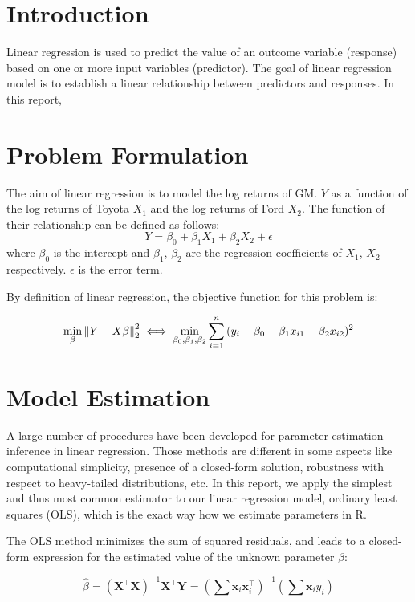 \section{Introduction}

Linear regression is used to predict the value of an outcome variable (response) based on one or more input variables (predictor). The goal of linear regression model is to establish a linear relationship between predictors and responses. In this report, 

\section{Problem Formulation}

The aim of linear regression is to model the log returns of GM. $Y$ as a function of the log returns of Toyota $X_1$ and the log returns of Ford $X_2$. The function of their relationship can be defined as follows:
$$Y = \beta_0 + \beta_1 X_1 + \beta_2 X_2 + \epsilon$$
where $\beta_0$ is the intercept and $\beta_1$, $\beta_2$ are the regression coefficients of $X_1$, $X_2$ respectively. $\epsilon$ is the error term.

By definition of linear regression, the objective function for this problem is:

$$\min_{\beta} \left\lVert Y - X \beta \right\rVert^2_2 \iff \min_{\beta_0, \beta_1, \beta_2} \sum_{i=1}^{n} {(y_i - \beta_0 - \beta_1 x_{i1} - \beta_2 x_{i2})^2}$$


\section{Model Estimation}

A large number of procedures have been developed for parameter estimation inference in linear regression. Those methods are different in some aspects like computational simplicity, presence of a closed-form solution, robustness with respect to heavy-tailed distributions, etc. In this report, we apply the simplest and thus most common estimator to our linear regression model, ordinary least squares (OLS), which is the exact way how we estimate parameters in R. 

The OLS method minimizes the sum of squared residuals, and leads to a closed-form expression for the estimated value of the unknown parameter $\beta$:

$$\hat{\beta} = (\mathbf{X}^\top \mathbf{X})^{-1} \mathbf{X}^\top \mathbf{Y} = (\sum{\mathbf{x}_i\mathbf{x}_i^\top})^{-1} (\sum{\mathbf{x}_i} y_i) $$ 

